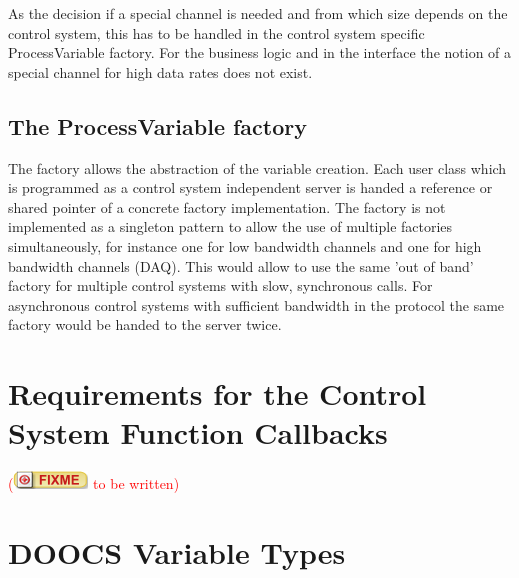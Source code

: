\documentclass[11pt,a4paper]{scrartcl}
\newcounter{nFixmes}
\newcommand{\fixme}[1]{\addtocounter{nFixmes}{1}\textcolor{red}{(\includegraphics[height=2ex]{fixme} #1)}\xspace}
\begin{document}
As the decision if a special channel is needed and from which size depends on the control system, this has to be handled in the control system specific ProcessVariable factory. For the business logic and in the interface the notion of a special channel for high data rates does not exist.

\subsection{The ProcessVariable factory}

The factory allows the abstraction of the variable creation. Each user class which is programmed as a control system independent server is handed a reference or shared pointer of a concrete factory implementation. The factory is not implemented as a singleton pattern to allow the use of multiple factories simultaneously, for instance one for low bandwidth channels and one for high bandwidth channels (DAQ). This would allow to use the same 'out of band' factory for multiple control systems with slow, synchronous calls. For asynchronous control systems with sufficient bandwidth in the protocol the same factory would be handed to the server twice.

\section{Requirements for the Control System Function Callbacks}\label{section_function_callbacks}
\fixme{to be written}

\appendix
\section{DOOCS Variable Types}
\end{document}
